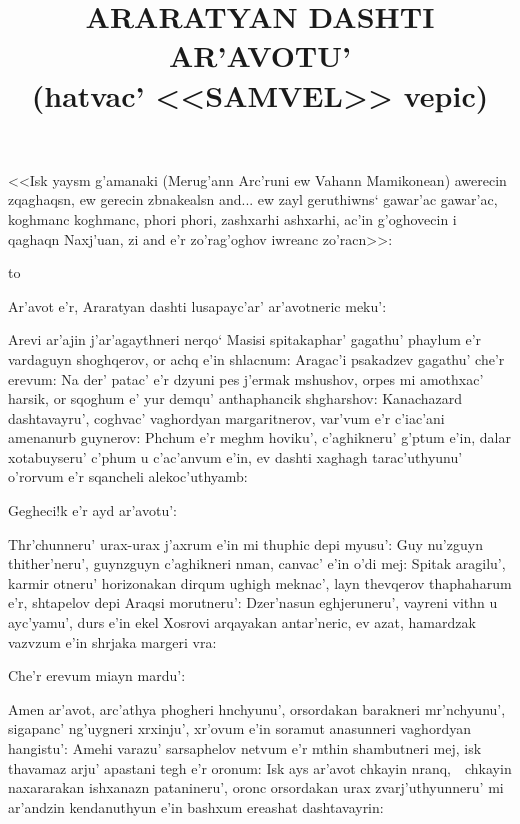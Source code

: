\documentclass[12pt,a4paper]{article}
\title{ARARATYAN DASHTI AR'AVOTU'\\
       \large(hatvac' \armbf{Raffu} <<SAMVEL>> vepic)}
\author{}
\date{}
\begin{document}
\maketitle

{\leftskip=150pt\small
%
<<Isk yaysm g'amanaki (Merug'ann Arc'runi ew Vahann Mamikonean) awerecin
zqaghaqsn, ew gerecin zbnakealsn and... ew zayl geruthiwns` gawar'ac gawar'ac,
koghmanc koghmanc, phori pho\-ri, zashxarhi ashxarhi, ac'in g'oghovecin i
qa\-ghaqn Naxj'uan, zi and e'r zo'rag'oghov iwreanc zo'racn>>:
%
\par}

\bigskip

\hbox to 

\vskip 40pt

Ar'avot e'r, Araratyan dashti lusapayc'ar' ar'avotneric meku':

Arevi ar'ajin j'ar'agaythneri nerqo` Masisi spitakaphar' gagathu' phaylum e'r
vardaguyn shoghqerov, or achq e'in shlacnum: Aragac'i psakadzev gagathu' che'r
erevum: Na der' patac' e'r dzyuni pes j'ermak mshushov, orpes mi amothxac'
harsik, or sqoghum e' yur demqu' anthaphancik shgharshov: Kanachazard
dashtavayru', coghvac' vaghordyan margaritnerov, var'vum e'r c'iac'ani
amenanurb guynerov: Phchum e'r meghm hoviku', c'aghikneru' g'ptum e'in, dalar
xotabuyseru' c'phum u c'ac'anvum e'in, ev dashti xa\-ghagh tarac'uthyunu'
o'rorvum e'r sqancheli alekoc'uthyamb:

Gegheci!k e'r ayd ar'avotu':

Thr'chunneru' urax-urax j'axrum e'in mi thuphic depi myusu': Guy\armuh
nu'zguyn thither'neru', guynzguyn c'aghikneri nman, canvac' e'in o'di mej:
Spitak aragilu', karmir otneru' horizonakan dirqum ughigh meknac', layn
thevqerov thaphaharum e'r, shtapelov depi Araqsi morutneru': Dzer'\-na\-sun
eghjeruneru', vayreni vithn u ayc'yamu', durs e'in ekel Xosrovi arqayakan
antar'neric, ev azat, hamardzak vazvzum e'in shrjaka mar\-ge\-ri vra:

Che'r erevum miayn mardu':

Amen ar'avot, arc'athya phogheri hnchyunu', orsordakan barakneri mr'nchyunu',
sigapanc' ng'uygneri xrxinju', xr'ovum e'in soramut a\-na\-sun\-ne\-ri
vaghordyan hangistu': Amehi varazu' sarsaphelov netvum e'r mthin shambutneri
mej, isk thavamaz arju' apastani tegh e'r oronum: Isk ays ar'avot chkayin
nranq,~\armemdash~chkayin naxararakan ishxanazn pa\-ta\-ni\-ne\-ru', oronc
orsordakan urax zvarj'uthyunneru' mi ar'andzin ken\-da\-nu\-thyun e'in bashxum
ereashat dashtavayrin:
\end{document}

